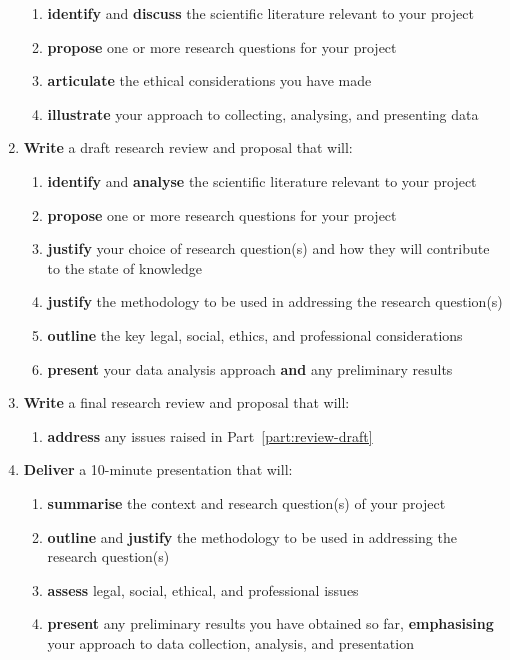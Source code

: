 \begin{enumerate}[label=(\Alph*)]
\begin{enumerate}[label=(\roman*)]
			\item \textbf{identify} and \textbf{discuss} the scientific literature
				relevant to your project
			\item \textbf{propose} one or more research questions for your project
			\item \textbf{articulate} the ethical considerations you have made
			\item \textbf{illustrate} your approach to collecting, analysing, and presenting data
		\end{enumerate}
	\item \label{part:review-draft} \textbf{Write} a draft research review and proposal
		that will:
		\begin{enumerate}[label=(\roman*)]
			\item \textbf{identify} and \textbf{analyse} the scientific literature
				relevant to your project
			\item \textbf{propose} one or more research questions for your project
			\item \textbf{justify} your choice of research question(s)
				and how they will contribute to the state of knowledge
			\item \textbf{justify} the methodology to be used
				in addressing the research question(s)
			\item \textbf{outline} the key legal, social, ethics, and professional considerations	
			\item \textbf{present} your data analysis approach \textbf{and} any preliminary results
		\end{enumerate}
	\item \textbf{Write} a final research review and proposal that will:
		\begin{enumerate}[label=(\roman*)]
			\item \textbf{address} any issues raised in Part~\ref{part:review-draft}
		\end{enumerate}
	\item \textbf{Deliver} a 10-minute presentation that will:
		\begin{enumerate}[label=(\roman*)]
			\item \textbf{summarise} the context and research question(s)
				of your project
			\item \textbf{outline} and \textbf{justify} the methodology to be used in
				addressing the research question(s)
			\item \textbf{assess} legal, social, ethical, and professional issues
			\item \textbf{present} any preliminary results you have obtained so far, \textbf{emphasising} your
				approach to data collection, analysis, and presentation
		\end{enumerate}
\end{enumerate}

